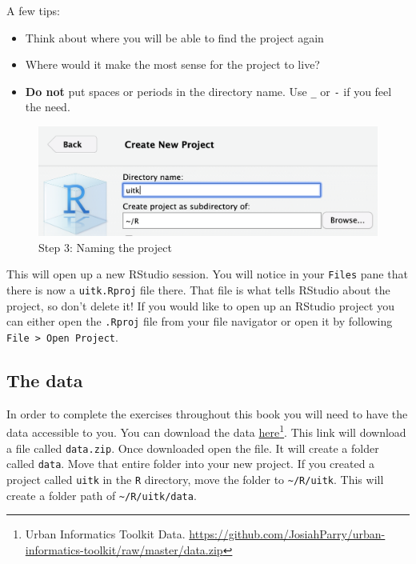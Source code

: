 \documentclass[
]{book}
\providecommand{\tightlist}{%
  \setlength{\itemsep}{0pt}\setlength{\parskip}{0pt}}
\begin{document}
A few tips:

\begin{itemize}
\tightlist
\item
  Think about where you will be able to find the project again
\item
  Where would it make the most sense for the project to live?
\item
  \textbf{Do not} put spaces or periods in the directory name. Use \texttt{\_} or \texttt{-} if you feel the need.
\end{itemize}

\begin{figure}
\centering
\includegraphics{static/03-project.png}
\caption{Step 3: Naming the project}
\end{figure}

This will open up a new RStudio session. You will notice in your \texttt{Files} pane that there is now a \texttt{uitk.Rproj} file there. That file is what tells RStudio about the project, so don't delete it! If you would like to open up an RStudio project you can either open the \texttt{.Rproj} file from your file navigator or open it by following \texttt{File\ \textgreater{}\ Open\ Project}.

\hypertarget{the-data}{%
\subsection{The data}\label{the-data}}

In order to complete the exercises throughout this book you will need to have the data accessible to you. You can download the data \href{https://github.com/JosiahParry/urban-informatics-toolkit/raw/master/data.zip}{here}\footnote{Urban Informatics Toolkit Data. \url{https://github.com/JosiahParry/urban-informatics-toolkit/raw/master/data.zip}}. This link will download a file called \texttt{data.zip}. Once downloaded open the file. It will create a folder called \texttt{data}. Move that entire folder into your new project. If you created a project called \texttt{uitk} in the \texttt{R} directory, move the folder to \texttt{\textasciitilde{}/R/uitk}. This will create a folder path of \texttt{\textasciitilde{}/R/uitk/data}.
\end{document}
